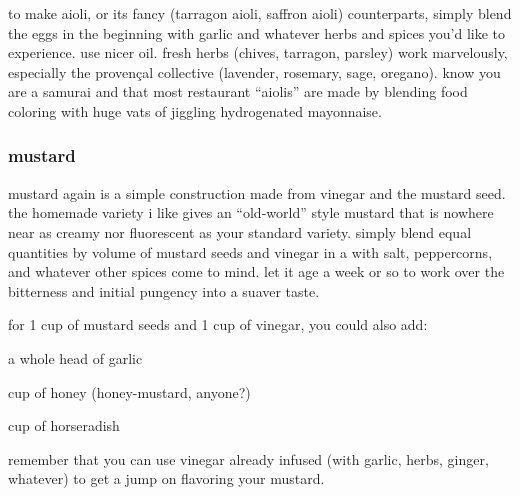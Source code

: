 to make aioli, or its fancy (tarragon aioli, saffron aioli) counterparts, 
simply blend the eggs in the beginning with garlic and whatever herbs and 
spices you'd like to experience. use nicer oil. fresh herbs (chives, tarragon, 
parsley) work marvelously, especially the proven\c{c}al collective (lavender, 
rosemary, sage, oregano). know you are a samurai and that most restaurant 
``aiolis'' are made by blending food coloring with huge vats of jiggling 
hydrogenated mayonnaise.

\subsubsection{mustard}

mustard again is a simple construction made from vinegar and the mustard seed. 
the homemade variety i like gives an ``old-world'' style mustard that is 
nowhere near as creamy nor fluorescent as your standard variety. simply blend 
equal quantities by volume of mustard seeds and vinegar in a  with salt, 
peppercorns, and whatever other spices come to mind. let it age a week or so 
to work over the bitterness and initial pungency into a suaver taste.

for 1 cup of mustard seeds and 1 cup of vinegar, you could also add:

\begin{ingredients}
  \item a whole head of garlic
  \item \threequarters cup of honey (honey-mustard, anyone?)
  \item \onequarter cup of horseradish
\end{ingredients}

remember that you can use vinegar already infused (with garlic, herbs, ginger, 
whatever) to get a jump on flavoring your mustard.
